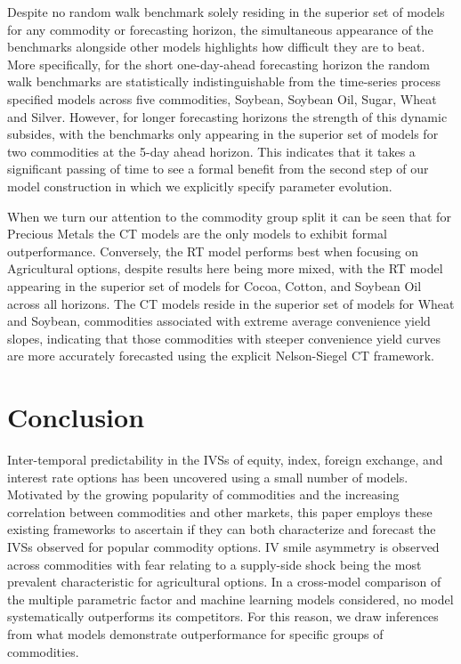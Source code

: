 \documentclass[12pt,a4paper]{article}
\begin{document}
Despite no random walk benchmark solely residing in the superior set of models for any commodity or forecasting horizon, the simultaneous appearance of the benchmarks alongside other models highlights how difficult they are to beat. More specifically, for the short one-day-ahead forecasting horizon the random walk benchmarks are statistically indistinguishable from the time-series process specified models across five commodities, Soybean, Soybean Oil, Sugar, Wheat and Silver. However, for longer forecasting horizons the strength of this dynamic subsides, with the benchmarks only appearing in the superior set of models for two commodities at the 5-day ahead horizon. This indicates that it takes a significant passing of time to see a formal benefit from the second step of our model construction in which we explicitly specify parameter evolution.

When we turn our attention to the commodity group split it can be seen that for Precious Metals the CT models are the only models to exhibit formal outperformance. Conversely, the RT model performs best when focusing on Agricultural options, despite results here being more mixed, with the RT model appearing in the superior set of models for Cocoa, Cotton, and Soybean Oil across all horizons. The CT models reside in the superior set of models for Wheat and Soybean, commodities associated with extreme average convenience yield slopes, indicating that those commodities with steeper convenience yield curves are more accurately forecasted using the explicit Nelson-Siegel CT framework.

\section{Conclusion}\label{sec:Conclusions}

Inter-temporal predictability in the IVSs of equity, index, foreign exchange, and interest rate options has been uncovered using a small number of models. Motivated by the growing popularity of commodities and the increasing correlation between commodities and other markets, this paper employs these existing frameworks to ascertain if they can both characterize and forecast the IVSs observed for popular commodity options. IV smile asymmetry is observed across commodities with fear relating to a supply-side shock being the most prevalent characteristic for agricultural options. In a cross-model comparison of the multiple parametric factor and machine learning models considered, no model systematically outperforms its competitors. For this reason, we draw inferences from what models demonstrate outperformance for specific groups of commodities.
\end{document}
